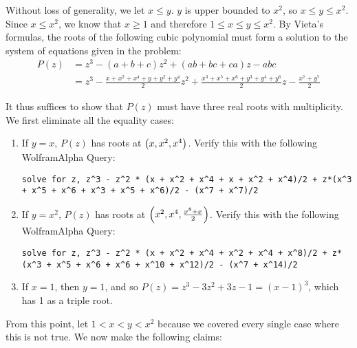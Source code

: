 \documentclass[10pt]{../usamts}
\begin{document}
\begin{solution}

Without loss of generality, we let $x \le y$. $y$ is upper bounded to $x^2$, so $x \le y \le x^2$. Since $x \le x^2$, we know that $x \ge 1$ and therefore $1 \le x \le y \le x^2$. By Vieta's formulas, the roots of the following cubic polynomial must form a solution to the system of equations given in the problem:
\begin{align*}
    P(z) &= z^3 - (a+b+c)z^2 + (ab+bc+ca)z -abc \\
         &= z^3 - \frac{x + x^2 + x^4 + y + y^2 + y^4}{2}z^2 + \frac{x^3 + x^5 + x^6 + y^3 + y^4 + y^6}{2}z - \frac{x^7 + y^7}{2}
\end{align*}

It thus suffices to show that $P(z)$ must have three real roots with multiplicity. We first eliminate all the equality cases:

\begin{enumerate}
\item If $y=x$, $P(z)$ has roots at $\left( x, x^2, x^4 \right)$. Verify this with the following WolframAlpha Query:
\begin{lstlisting}
solve for z, z^3 - z^2 * (x + x^2 + x^4 + x + x^2 + x^4)/2 + z*(x^3 + x^5 + x^6 + x^3 + x^5 + x^6)/2 - (x^7 + x^7)/2
\end{lstlisting}
    
\item If $y=x^2$, $P(z)$ has roots at $\left( x^2, x^4, \frac{x^8 + x}{2} \right)$. Verify this with the following WolframAlpha Query:
\begin{lstlisting}
solve for z, z^3 - z^2 * (x + x^2 + x^4 + x^2 + x^4 + x^8)/2 + z*(x^3 + x^5 + x^6 + x^6 + x^10 + x^12)/2 - (x^7 + x^14)/2
\end{lstlisting}

\item If $x=1$, then $y=1$, and so $P(z) = z^3 - 3z^2 + 3z - 1 = (x-1)^3$, which has 1 as a triple root.
\end{enumerate}

From this point, let $1 < x < y < x^2$ because we covered every single case where this is not true. We now make the following claims:


\end{solution}
\end{document}
